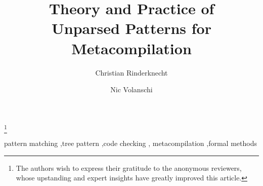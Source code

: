 \documentclass{elsart}
\begin{document}
\begin{frontmatter}

\title{Theory and Practice of\\ Unparsed Patterns for Metacompilation}

\author[ChR]{Christian Rinderknecht}
\author{Nic Volanschi}

\address[ChR]{Konkuk University, 143-701 Seoul Gwangjin-gu Hwayang-dong,
  South Korea}

\thanks{The authors wish to express their gratitude to the anonymous
  reviewers, whose upstanding and expert insights have greatly
  improved this article.}



\begin{keyword}
pattern matching \sep tree pattern \sep code checking \sep
metacompilation \sep formal methods
\end{keyword}
\end{frontmatter}

\allowdisplaybreaks











\end{document}
